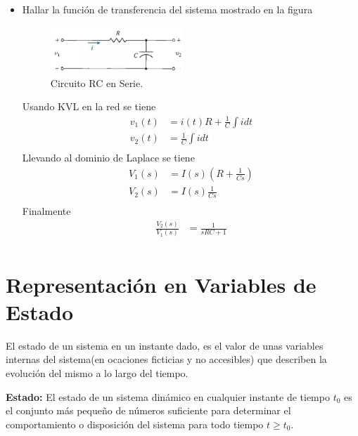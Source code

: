 \documentclass[12pt]{article}
\begin{document}
\begin{itemize}
    \item Hallar la función de transferencia del sistema mostrado en la figura
    \begin{figure}[h]
        \centering
            \includegraphics[width=5cm]{IMAGENES/transfer4}
            \caption{Circuito RC en Serie.}
    \end{figure}

    Usando KVL en la red se tiene
    \begin{equation}
        \begin{split}
        v_{1}(t)&=i(t)R+\frac{1}{C}\int idt\\
        v_{2}(t)&=\frac{1}{C}\int idt\\
        \end{split}
    \label{eq:ejer_transfer4}
    \end{equation}
    Llevando al dominio de Laplace se tiene
    \begin{equation}
        \begin{split}
        V_{1}(s)&=I(s)(R+\frac{1}{Cs})\\
        V_{2}(s)&=I(s)\frac{1}{Cs}\\
        \end{split}
    \label{eq:ejer_transfer41}
    \end{equation}
    Finalmente
    \begin{equation}
        \begin{split}
        \frac{V_{2}(s)}{V_{1}(s)}&=\frac{1}{sRC+1}\\
        \end{split}
    \label{eq:ejer_transfer42}
    \end{equation}
\end{itemize}

\section{Representación en Variables de Estado}
El estado de un sistema en un instante dado, es el valor de unas variables internas del sistema(en ocaciones ficticias y no accesibles) que describen la evolución del mismo a lo largo del tiempo.

\textbf{Estado:}
\vspace{5mm}
El estado de un sistema dinámico en cualquier instante de tiempo $t_{0}$ es el conjunto más pequeño de números suficiente para determinar el comportamiento o disposición del sistema para todo tiempo $t\geq t_{0}$.
\end{document}
